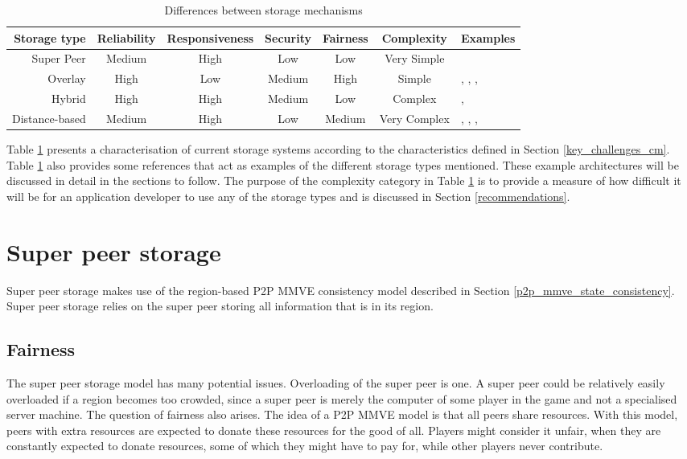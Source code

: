 \begin{table}[htbp]
\centering
\begin{tabular}{|r|c|c|c|c|c|l|}
\hline
Storage type & Reliability & Responsiveness & Security & Fairness & Complexity & Examples\\
\hline
Super Peer & Medium & High & Low & Low & Very Simple & \cite{knutsson_p2p_first}\\
Overlay & High & Low & Medium & High & Simple & \cite{Douglas05enablingmassively}, \cite{using_freenet_storage},
\cite{Fan_phd}, \cite{past_storage_focus}\\
Hybrid & High & High & Medium & Low & Complex & \cite{zoned_federation}, \cite{hybrid_storage1}\\
Distance-based & Medium & High & Low & Medium & Very Complex & \cite{Buyukkaya_voronoi_state_management}, \cite{Hu_voronoi_IM},
\cite{colyseus_distance_based}, \cite{solipsis}\\
\hline
\end{tabular}
\caption{Differences between storage mechanisms} \label{tab_storage}
\end{table}
%
Table \ref{tab_storage} presents a characterisation of current storage systems according to the characteristics defined in Section
\ref{key_challenges_cm}. Table \ref{tab_storage} also provides some references that act as examples of the different storage types mentioned. These
example architectures will be discussed in detail in the sections to follow. The purpose of the complexity category in Table \ref{tab_storage} is to
provide a measure of how difficult it will be for an application developer to use any of the storage types and is discussed in Section
\ref{recommendations}.

\section{Super peer storage}
\label{super_peer_storage}

Super peer storage makes use of the region-based P2P MMVE consistency model described in Section \ref{p2p_mmve_state_consistency}. Super peer storage relies on the super peer storing all information that is in its region.

\subsection{Fairness}
The super peer storage model has many potential issues. Overloading of the super peer is one. A super peer could be relatively easily overloaded if a region becomes too crowded, since a super peer is merely the computer of some player in the game and not a specialised server machine. The question of fairness also arises. The idea of a P2P MMVE model is that all peers share resources. With this model, peers with extra resources are expected to donate these resources for the good of all. Players might consider it unfair, when they are constantly expected to donate resources, some of which they might have to pay for, while other players never contribute.

